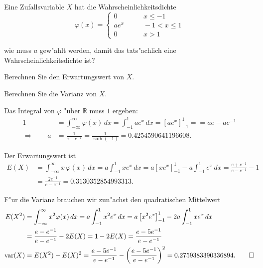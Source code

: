 Eine Zufallsvariable $X$ hat die Wahrscheinlichkeitsdichte
\[
\varphi(x)=\begin{cases}
0&\qquad x\le -1\\
ae^x&\qquad -1<x\le 1\\
0&\qquad x > 1
\end{cases}
\]
\begin{teilaufgaben}
\item wie muss $a$ gew"ahlt werden, damit das tats"achlich eine
Wahrscheinlichkeitsdichte ist?
\item Berechnen Sie den Erwartungswert von $X$.
\item Berechnen Sie die Varianz von $X$.
\end{teilaufgaben}

\begin{loesung}
\begin{teilaufgaben}
\item
Das Integral von $\varphi$ "uber $\mathbb R$ muss $1$ ergeben:
\begin{align*}
1
&=
\int_{-\infty}^{\infty} \varphi(x)\,dx
=
\int_{-1}^1ae^x\,dx
=
\left[ae^x\right]_{-1}^1
=
=ae-ae^{-1}
\\
\Rightarrow\qquad
a&=\frac1{e-e^{-1}}=\frac1{\sinh(-1)}
=
0.4254590641196608.
\end{align*}
\item
Der Erwartungswert ist
\begin{align*}
E(X)
&=
\int_{-\infty}^\infty x\,\varphi(x)\,dx
=
a\int_{-1}^1xe^x\,dx
=
a\left[xe^x\right]_{-1}^1-a\int_{-1}^1e^x\,dx
=
\frac{e+e^{-1}}{e-e^{-1}}-1
\\
&=
\frac{2e^{-1}}{e-e^{-1}}
=
0.3130352854993313.
\end{align*}
\item
F"ur die Varianz brauchen wir zun"achst den quadratischen Mittelwert
\begin{align*}
E(X^2)
&=
\int_{-\infty}^\infty x^2\varphi(x)\, dx
=
a\int_{-1}^1 x^2e^x\,dx
=
a\left[x^2e^x\right]_{-1}^1
-
2a\int_{-1}^1xe^x\,dx
\\
&=
\frac{e-e^{-1}}{e-e^{-1}}
-2E(X)
=
1-2E(X)
=
\frac{e-5e^{-1}}{e-e^{-1}}
\\
\operatorname{var}(X)
&=
E(X^2)-E(X)^2
=
\frac{e-5e^{-1}}{e-e^{-1}}
-
\biggl(
\frac{e-5e^{-1}}{e-e^{-1}}
\biggr)^2
=
0.2759383390336894.
\qedhere
\end{align*}
\end{teilaufgaben}
\end{loesung}


